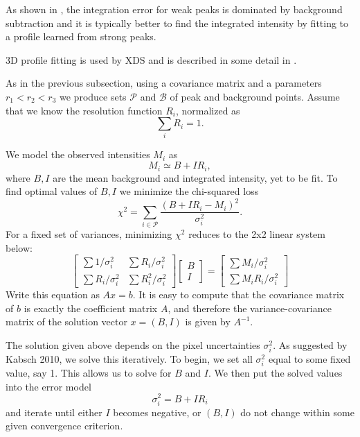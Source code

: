 \documentclass[11pt,a4paper]{article}
\def\calP{\mathcal{P}}
\def\calB{\mathcal{B}}
\begin{document}
As shown in \cite{Dia69}, the integration error for weak peaks is dominated by background subtraction
and it is typically better to find the integrated intensity by fitting to a profile learned from strong peaks.

3D profile fitting is used by XDS \cite{Kab10a} and is described in some detail in \cite{Kab88,Kab10b}.

As in the previous subsection, using a covariance matrix and a parameters $r_1 < r_2 < r_3$ we produce sets $\calP$ and $\calB$ of peak and background points.
Assume that we know the resolution function $R_i$,
normalized as
\begin{equation}\label{Eresnor}
  \sum_i R_i = 1.
\end{equation}

We model the observed intensities $M_i$ as
\begin{equation} M_i \simeq B + I R_i, \end{equation}
where $B, I$ are the mean background and integrated intensity, yet to be fit. To find optimal values of $B,I$ we minimize the chi-squared loss
\begin{equation} \chi^2 = \sum_{i \in \calP} \frac{(B+IR_i - M_i)^2}{\sigma^2_i}. \end{equation}
For a fixed set of variances, minimizing $\chi^2$ reduces to the 2x2 linear system below:
\begin{equation}
  \begin{bmatrix}
    \sum 1/\sigma^2_i & \sum R_i / \sigma^2_i \\
    \sum R_i/\sigma_i^2 & \sum R_i^2 / \sigma^2_i
  \end{bmatrix}
  \begin{bmatrix}
    B \\
    I
  \end{bmatrix}
  =
  \begin{bmatrix}
    \sum M_i/\sigma^2_i \\
    \sum M_i R_i / \sigma^2_i
  \end{bmatrix}
\end{equation}
Write this equation as $Ax = b$. It is easy to compute that the covariance matrix of $b$ is exactly the coefficient matrix
 $A$, and therefore the variance-covariance matrix of the solution vector $x = (B, I)$ is given by $A^{-1}$.

The solution given above depends on the pixel uncertainties $\sigma_i^2$. As suggested by Kabsch 2010, we solve this iteratively. To begin, we set all $\sigma^2_i$ equal to some fixed value, say 1. This allows us to solve for $B$ and $I$. We then put the solved values into the error model
\begin{equation} \sigma_i^2 = B + I R_i \end{equation}
and iterate until either $I$ becomes negative, or $(B, I)$ do not change within some given convergence criterion.
\end{document}
